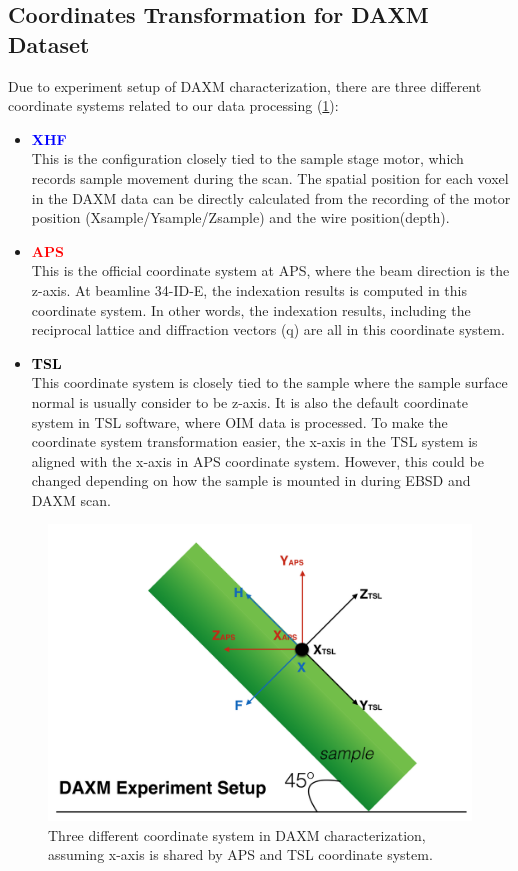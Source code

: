 \documentclass[12pt]{scrartcl}
\begin{document}
\subsection{Coordinates Transformation for DAXM Dataset}
\label{sec:coord}
Due to experiment setup of DAXM characterization, there are three different coordinate systems related to our data processing (\cref{fig:daxmcoord}):
\begin{itemize}
\item \textcolor{blue}{\textbf{XHF}} \\
This is the configuration closely tied to the sample stage motor, which records sample movement during the scan.
The spatial position for each voxel in the DAXM data can be directly calculated from the recording of the motor position (Xsample/Ysample/Zsample) and the wire position(depth).

\item \textcolor{red}{\textbf{APS}} \\
This is the official coordinate system at APS, where the beam direction is the z-axis.
At beamline 34-ID-E, the indexation results is computed in this coordinate system.
In other words, the indexation results, including the reciprocal lattice and diffraction vectors (\tnsr q) are all in this coordinate system.

\item \textcolor{black}{\textbf{TSL}} \\
This coordinate system is closely tied to the sample where the sample surface normal is usually consider to be z-axis. 
It is also the default coordinate system in TSL software, where OIM data is processed. 
To make the coordinate system transformation easier, the x-axis in the TSL system is aligned with the x-axis in APS coordinate system.
However, this could be changed depending on how the sample is mounted in during EBSD and DAXM scan.

\end{itemize}

\begin{figure}[htp]
\centering
\includegraphics[width=.7\linewidth]{daxmcoord.png}
\caption{Three different coordinate system in DAXM characterization, assuming x-axis is shared by APS and TSL coordinate system.}
\label{fig:daxmcoord}
\end{figure}
\end{document}
